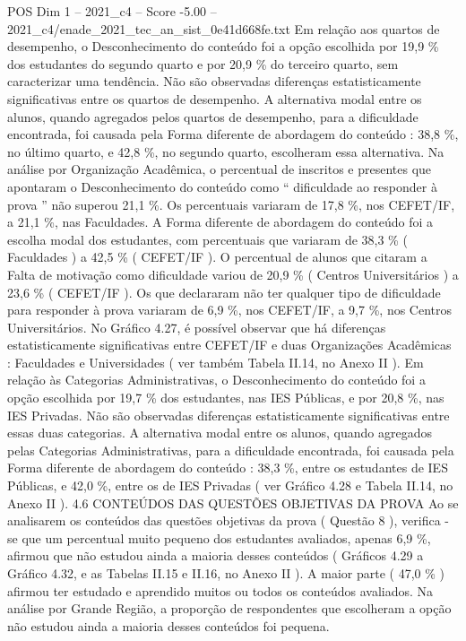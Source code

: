 \begin{textsample}{POS Dim 1 – 2021\_c4 – Score -5.00 – 2021\_c4/enade\_2021\_tec\_an\_sist\_0e41d668fe.txt}
Em relação aos quartos de desempenho, o Desconhecimento do conteúdo foi a opção escolhida por 19,9 \% dos estudantes do segundo quarto e por 20,9 \% do terceiro quarto, sem caracterizar uma tendência.
Não são observadas diferenças estatisticamente significativas entre os quartos de desempenho.
A alternativa modal entre os alunos, quando agregados pelos quartos de desempenho, para a dificuldade encontrada, foi causada pela Forma diferente de abordagem do conteúdo : 38,8 \%, no último quarto, e 42,8 \%, no segundo quarto, escolheram essa alternativa.
Na análise por Organização Acadêmica, o percentual de inscritos e presentes que apontaram o Desconhecimento do conteúdo como “ dificuldade ao responder à prova ” não superou 21,1 \%.
Os percentuais variaram de 17,8 \%, nos CEFET/IF, a 21,1 \%, nas Faculdades.
A Forma diferente de abordagem do conteúdo foi a escolha modal dos estudantes, com percentuais que variaram de 38,3 \% ( Faculdades ) a 42,5 \% ( CEFET/IF ).
O percentual de alunos que citaram a Falta de motivação como dificuldade variou de 20,9 \% ( Centros Universitários ) a 23,6 \% ( CEFET/IF ).
Os que declararam não ter qualquer tipo de dificuldade para responder à prova variaram de 6,9 \%, nos CEFET/IF, a 9,7 \%, nos Centros Universitários.
No Gráfico 4.27, é possível observar que há diferenças estatisticamente significativas entre CEFET/IF e duas Organizações Acadêmicas : Faculdades e Universidades ( ver também Tabela II.14, no Anexo II ).
Em relação às Categorias Administrativas, o Desconhecimento do conteúdo foi a opção escolhida por 19,7 \% dos estudantes, nas IES Públicas, e por 20,8 \%, nas IES Privadas.
Não são observadas diferenças estatisticamente significativas entre essas duas categorias.
A alternativa modal entre os alunos, quando agregados pelas Categorias Administrativas, para a dificuldade encontrada, foi causada pela Forma diferente de abordagem do conteúdo : 38,3 \%, entre os estudantes de IES Públicas, e 42,0 \%, entre os de IES Privadas ( ver Gráfico 4.28 e Tabela II.14, no Anexo II ). 4.6 CONTEÚDOS DAS QUESTÕES OBJETIVAS DA PROVA Ao se analisarem os conteúdos das questões objetivas da prova ( Questão 8 ), verifica -se que um percentual muito pequeno dos estudantes avaliados, apenas 6,9 \%, afirmou que não estudou ainda a maioria desses conteúdos ( Gráficos 4.29 a Gráfico 4.32, e as Tabelas II.15 e II.16, no Anexo II ).
A maior parte ( 47,0 \% ) afirmou ter estudado e aprendido muitos ou todos os conteúdos avaliados.
Na análise por Grande Região, a proporção de respondentes que escolheram a opção não estudou ainda a maioria desses conteúdos foi pequena.

\end{textsample}
